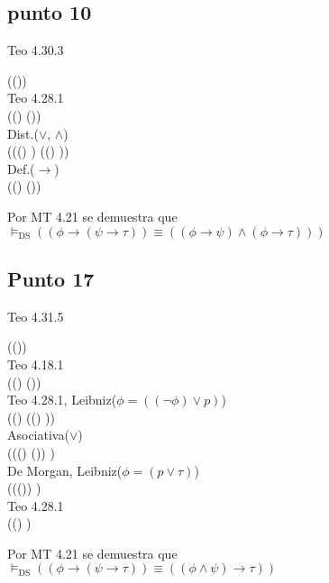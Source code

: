 \documentclass{article}
\begin{document}
\subsection{punto 10}
\begin{logicenv}{Teo 4.30.3}
    \begin{derivation}
            (\phi \to (\psi \land \tau))\\
        Teo 4.28.1\\
            ((\neg \phi) \lor (\psi \land \tau))\\
        Dist.($\lor$, $\land$)\\
            (((\neg \phi) \lor \psi) \land ((\neg \phi) \lor \tau))\\
        Def.($\to$)\\
            ((\phi \to \psi) \land (\phi \to \tau))
    \end{derivation}
    Por MT 4.21 se demuestra que\\
    $\vDash_{\text{DS}} ((\phi \to (\psi \to \tau)) \equiv ((\phi \to \psi) \land (\phi \to \tau)))$
\end{logicenv}

\subsection{Punto 17}
\begin{logicenv}{Teo 4.31.5}
    \begin{derivation}
            (\phi \to (\psi \to \tau))\\
        Teo 4.18.1\\
            ((\neg \phi) \lor (\psi \to \tau))\\
        Teo 4.28.1, Leibniz($\phi = ((\neg \phi) \lor p)$)\\
            ((\neg \phi) \lor ((\neg \psi) \lor \tau))\\
        Asociativa($\lor$)\\
            (((\neg \phi) \lor (\neg \psi)) \lor \tau)\\
        De Morgan, Leibniz($\phi = (p \lor \tau)$)\\
            ((\neg (\phi \land \psi)) \lor \tau)\\
        Teo 4.28.1\\
            ((\phi \land \psi) \to \tau)
    \end{derivation}
    Por MT 4.21 se demuestra que\\
    $\vDash_{\text{DS}} ((\phi \to (\psi \to \tau)) \equiv ((\phi \land \psi) \to \tau))$
\end{logicenv}
\end{document}
